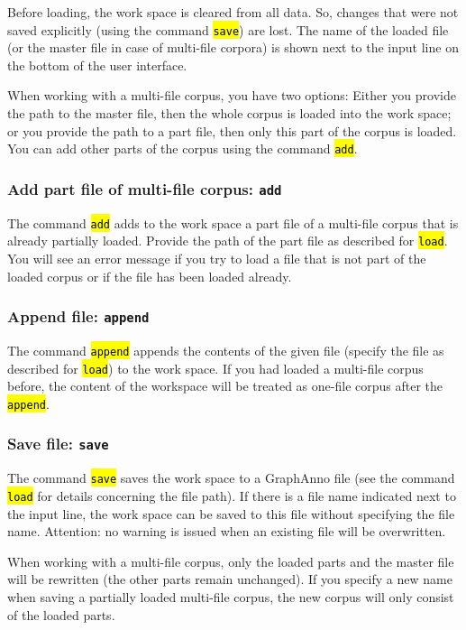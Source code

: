 \documentclass[12pt]{scrartcl}
\newcommand{\code}[1]{\hl{\texttt{#1}}}
\begin{document}
Before loading, the work space is cleared from all data.
So, changes that were not saved explicitly (using the command \code{save}) are lost.
The name of the loaded file (or the master file in case of multi-file corpora) is shown next to the input line on the bottom of the user interface.

When working with a multi-file corpus, you have two options:
Either you provide the path to the master file, then the whole corpus is loaded into the work space; or you provide the path to a part file, then only this part of the corpus is loaded.
You can add other parts of the corpus using the command \code{add}.


\subsubsection{Add part file of multi-file corpus: \texttt{add}}

The command \code{add} adds to the work space a part file of a multi-file corpus that is already partially loaded.
Provide the path of the part file as described for \code{load}.
You will see an error message if you try to load a file that is not part of the loaded corpus or if the file has been loaded already.


\subsubsection{Append file: \texttt{append}}

The command \code{append} appends the contents of the given file (specify the file as described for \code{load}) to the work space.
If you had loaded a multi-file corpus before, the content of the workspace will be treated as one-file corpus after the \code{append}.


\subsubsection{Save file: \texttt{save}}

The command \code{save} saves the work space to a GraphAnno file (see the command \code{load} for details concerning the file path).
If there is a file name indicated next to the input line, the work space can be saved to this file without specifying the file name.
Attention: no warning is issued when an existing file will be overwritten.

When working with a multi-file corpus, only the loaded parts and the master file will be rewritten (the other parts remain unchanged).
If you specify a new name when saving a partially loaded multi-file corpus, the new corpus will only consist of the loaded parts.
\end{document}
